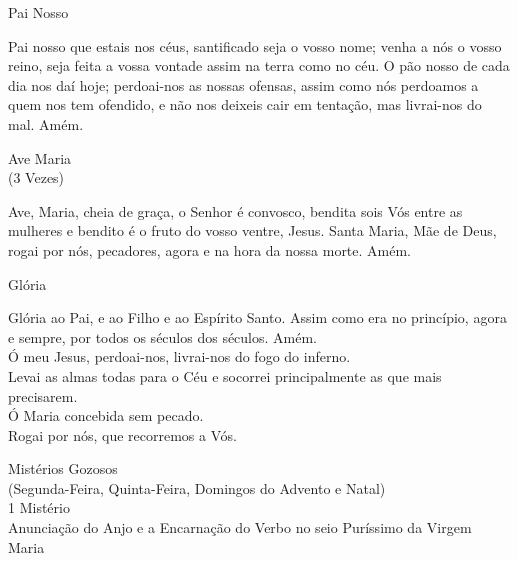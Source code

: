 \documentclass{book}
\begin{document}
\begin{center}
    Pai Nosso
\end{center}
\begin{flushleft}
    Pai nosso que estais nos céus, santificado seja o vosso nome; venha a nós o vosso reino, seja feita a vossa vontade assim na terra como no céu. O pão nosso de cada dia nos daí hoje; perdoai-nos as nossas ofensas, assim como nós perdoamos a quem nos tem ofendido, e não nos deixeis cair em tentação, mas livrai-nos do mal. Amém.
\end{flushleft}
\begin{center}
    Ave Maria \\ \textcolor{VioletRed2}{\scriptsize{(3 Vezes)}}
\end{center}
\begin{flushleft}
    Ave, Maria, cheia de graça, o Senhor é convosco, bendita sois Vós entre as mulheres e bendito é o fruto do vosso ventre, Jesus. Santa Maria, Mãe de Deus, rogai por nós, pecadores, agora e na hora da nossa morte. Amém.
\end{flushleft}
\begin{center}
    Glória
\end{center}
\begin{flushleft}
    Glória ao Pai, e ao Filho e ao Espírito Santo. Assim como era no princípio, agora e sempre, por todos os séculos dos séculos. Amém. \\
    \hfill{} \break{}
    \VbarRed{} Ó meu Jesus, perdoai-nos, livrai-nos do fogo do inferno. \\
    \RbarRed{} Levai as almas todas para o Céu e socorrei principalmente as que mais precisarem. \\
    \hfill{} \break{}
    \VbarRed{} Ó Maria concebida sem pecado.\\
    \RbarRed{} Rogai por nós, que recorremos a Vós.
\end{flushleft}
\newpage
\begin{center}
    Mistérios Gozosos \\ \textcolor{VioletRed2}{\scriptsize{(Segunda-Feira, Quinta-Feira, Domingos do Advento e Natal)}} \\
    \hfill{} \break{}
    1\textordmasculine{} Mistério \\ Anunciação do Anjo e a Encarnação do Verbo no seio Puríssimo da Virgem Maria
\end{center}
\end{document}
